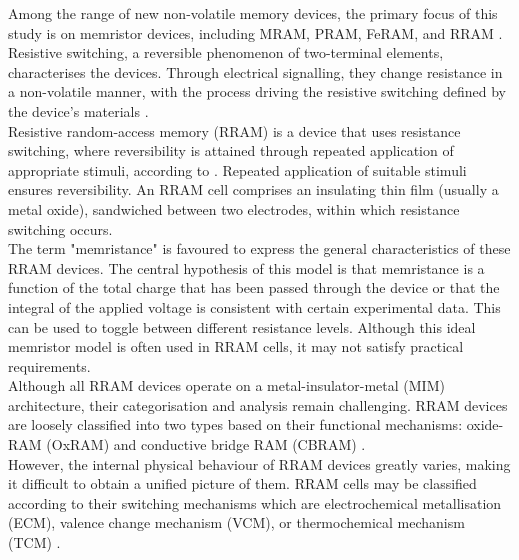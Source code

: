 \noindent Among the range of new non-volatile memory devices, the primary focus of this study is on memristor devices, including MRAM, PRAM, FeRAM, and RRAM \cite{wang2017memristors}. Resistive switching, a reversible phenomenon of two-terminal elements, characterises the devices. Through electrical signalling, they change resistance in a non-volatile manner, with the process driving the resistive switching defined by the device's materials \cite{mehonic2018silicon}. \\

\noindent Resistive random-access memory (RRAM) is a device that uses resistance switching, where reversibility is attained through repeated application of appropriate stimuli, according to \cite{liu2010controllable}. Repeated application of suitable stimuli ensures reversibility. An RRAM cell comprises an insulating thin film (usually a metal oxide), sandwiched between two electrodes, within which resistance switching occurs. \\

\noindent The term "memristance" is favoured to express the general characteristics of these RRAM devices. The central hypothesis of this model is that memristance is a function of the total charge that has been passed through the device or that the integral of the applied voltage is consistent with certain experimental data. This can be used to toggle between different resistance levels. Although this ideal memristor model is often used in RRAM cells, it may not satisfy practical requirements. \\


\noindent Although all RRAM devices operate on a metal-insulator-metal (MIM) architecture, their categorisation and analysis remain challenging. RRAM devices are loosely classified into two types based on their functional mechanisms: oxide-RAM (OxRAM) and conductive bridge RAM (CBRAM) \cite{liu2015categorization}. \\

\noindent However, the internal physical behaviour of RRAM devices greatly varies, making it difficult to obtain a unified picture of them. RRAM cells may be classified according to their switching mechanisms which are electrochemical metallisation (ECM), valence change mechanism (VCM), or thermochemical mechanism (TCM) \cite{goux2016electrochemical}. \\

